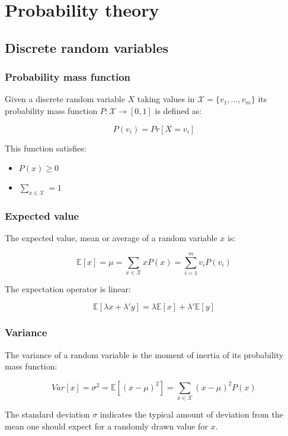 \chapter{Probability theory}

\section{Discrete random variables}

	\subsection{Probability mass function}
	Given a discrete random variable $X$ taking values in $\mathcal{X} = \{v_1, \dots, v_m\}$ its probability mass function $P:\mathcal{X}\rightarrow [0,1]$ is defined as:

	$$P(v_i) = Pr[X = v_i]$$

	This function satisfies:
	
	\begin{multicols}{2}
		\begin{itemize}
			\item $P(x) \ge 0$
			\item $\sum\limits_{x\in \mathcal{X}} = 1$
		\end{itemize}
	\end{multicols}

	\subsection{Expected value}
	The expected value, mean or average of a random variable $x$ is:

	$$\mathbb{E}[x] = \mu = \sum\limits_{x\in\mathcal{X}}xP(x) = \sum\limits_{i=1}^mv_iP(v_i)$$

	The expectation operator is linear:

	$$\mathbb{E}[\lambda x + \lambda'y] = \lambda\mathbb{E}[x] + \lambda'\mathbb{E}[y]$$

	\subsection{Variance}
	The variance of a random variable is the moment of inertia of its probability mass function:

	$$Var[x] = \sigma^2 = \mathbb{E}[(x-\mu)^2] = \sum\limits_{x\in\mathcal{X}}(x-\mu)^2P(x)$$

	The standard deviation $\sigma$ indicates the typical amount of deviation from the mean one should expect for a randomly drawn value for $x$.

